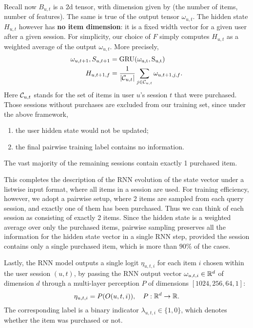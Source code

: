 Recall now $B_{u, t}$ is a 2d tensor, with dimension given by (the number of items, number of features). The same is true of the output tensor $\omega_{u,t}$. The hidden state $H_{u, t}$ however has \textbf{no item dimension}: it is a fixed width vector for a given user after a given session. For simplicity, our choice of $F$ simply computes $H_{u, t}$ as a weighted average of the output $\omega_{u, t}$. More precisely,
\begin{align}
    \omega_{u, t+1}, S_{u, t+1} &= \rm{GRU}(\omega_{u, t}, S_{u, t}) \\
    H_{u, t+1, f} &= \frac{1}{|\mathcal{C}_{u, t}|} \sum_{j \in \mathcal{C}_{u, t}} \omega_{u, t+1, j, f}. 
\end{align}
Here $\mathcal{C}_{u, t}$ stands for the set of items in user $u$'s session $t$ that were purchased. Those sessions without purchases are excluded from our training set, since under the above framework, 
\begin{enumerate}
    \item the user hidden state would not be updated;
    \item the final pairwise training label contains no information.
\end{enumerate} 
The vast majority of the remaining sessions contain exactly 1 purchased item.

This completes the description of the RNN evolution of the state vector under a listwise input format, where all items in a session are used. For training efficiency, however, we adopt a pairwise setup, where 2 items are sampled from each query session, and exactly one of them has been purchased. Thus we can think of each session as consisting of exactly 2 items. Since the hidden state is a weighted average over only the purchased items, pairwise sampling preserves all the information for the hidden state vector in a single RNN step, provided the session contains only a single purchased item, which is more than $90\%$ of the cases.

Lastly, the RNN model outputs a single logit $\eta_{u, t, i}$ for each item $i$ chosen within the user session $(u, t)$, by passing the RNN output vector $\omega_{u, t, i} \in \mathbb{R}^d$ of dimension $d$ through a multi-layer perception $P$ of dimensions $[1024, 256, 64, 1]$:
\begin{align} \label{eq:rnn_output}
    \eta_{u, t, i} = P(O(u, t, i)),  \quad P: \mathbb{R}^d \to \mathbb{R}.
\end{align}
The corresponding label is a binary indicator $\lambda_{u, t, i} \in \{1, 0\}$, which denotes whether the item was purchased or not.

